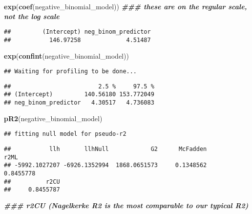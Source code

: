 \documentclass[
]{article}
\newenvironment{Shaded}{\begin{snugshade}}{\end{snugshade}}
\newcommand{\DocumentationTok}[1]{\textcolor[rgb]{0.56,0.35,0.01}{\textbf{\textit{#1}}}}
\newcommand{\FunctionTok}[1]{\textcolor[rgb]{0.13,0.29,0.53}{\textbf{#1}}}
\newcommand{\NormalTok}[1]{#1}
\begin{document}
\begin{Shaded}
\begin{Highlighting}[]
\FunctionTok{exp}\NormalTok{(}\FunctionTok{coef}\NormalTok{(negative\_binomial\_model)) }\DocumentationTok{\#\#\# these are on the \textquotesingle{}regular\textquotesingle{} scale, not the log scale}
\end{Highlighting}
\end{Shaded}

\begin{verbatim}
##         (Intercept) neg_binom_predictor 
##           146.97258             4.51487
\end{verbatim}

\begin{Shaded}
\begin{Highlighting}[]
\FunctionTok{exp}\NormalTok{(}\FunctionTok{confint}\NormalTok{(negative\_binomial\_model))}
\end{Highlighting}
\end{Shaded}

\begin{verbatim}
## Waiting for profiling to be done...
\end{verbatim}

\begin{verbatim}
##                         2.5 %     97.5 %
## (Intercept)         140.56180 153.772049
## neg_binom_predictor   4.30517   4.736083
\end{verbatim}

\begin{Shaded}
\begin{Highlighting}[]
\FunctionTok{pR2}\NormalTok{(negative\_binomial\_model)}
\end{Highlighting}
\end{Shaded}

\begin{verbatim}
## fitting null model for pseudo-r2
\end{verbatim}

\begin{verbatim}
##           llh       llhNull            G2      McFadden          r2ML 
## -5992.1027207 -6926.1352994  1868.0651573     0.1348562     0.8455778 
##          r2CU 
##     0.8455787
\end{verbatim}

\begin{Shaded}
\begin{Highlighting}[]
\DocumentationTok{\#\#\# r2CU (Nagelkerke R2 is the most comparable to our typical R2)}
\end{Highlighting}
\end{Shaded}
\end{document}
